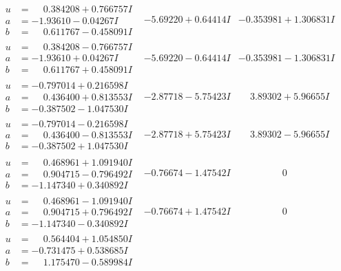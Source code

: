 \documentclass[1p]{elsarticle_modified}
\theoremstyle{definition}
\begin{document}
$$\begin{array}{c|c|c}
\begin{aligned}
u &= \phantom{-}0.384208 + 0.766757 I \\
a &= -1.93610 - 0.04267 I \\
b &= \phantom{-}0.611767 - 0.458091 I\end{aligned}
 & -5.69220 + 0.64414 I & -0.353981 + 1.306831 I \\ \hline\begin{aligned}
u &= \phantom{-}0.384208 - 0.766757 I \\
a &= -1.93610 + 0.04267 I \\
b &= \phantom{-}0.611767 + 0.458091 I\end{aligned}
 & -5.69220 - 0.64414 I & -0.353981 - 1.306831 I \\ \hline\begin{aligned}
u &= -0.797014 + 0.216598 I \\
a &= \phantom{-}0.436400 + 0.813553 I \\
b &= -0.387502 - 1.047530 I\end{aligned}
 & -2.87718 - 5.75423 I & \phantom{-}3.89302 + 5.96655 I \\ \hline\begin{aligned}
u &= -0.797014 - 0.216598 I \\
a &= \phantom{-}0.436400 - 0.813553 I \\
b &= -0.387502 + 1.047530 I\end{aligned}
 & -2.87718 + 5.75423 I & \phantom{-}3.89302 - 5.96655 I \\ \hline\begin{aligned}
u &= \phantom{-}0.468961 + 1.091940 I \\
a &= \phantom{-}0.904715 - 0.796492 I \\
b &= -1.147340 + 0.340892 I\end{aligned}
 & -0.76674 - 1.47542 I & \phantom{-0.000000 } 0 \\ \hline\begin{aligned}
u &= \phantom{-}0.468961 - 1.091940 I \\
a &= \phantom{-}0.904715 + 0.796492 I \\
b &= -1.147340 - 0.340892 I\end{aligned}
 & -0.76674 + 1.47542 I & \phantom{-0.000000 } 0 \\ \hline\begin{aligned}
u &= \phantom{-}0.564404 + 1.054850 I \\
a &= -0.731475 + 0.538685 I \\
b &= \phantom{-}1.175470 - 0.589984 I\end{aligned}

\end{array}$$
\end{document}
